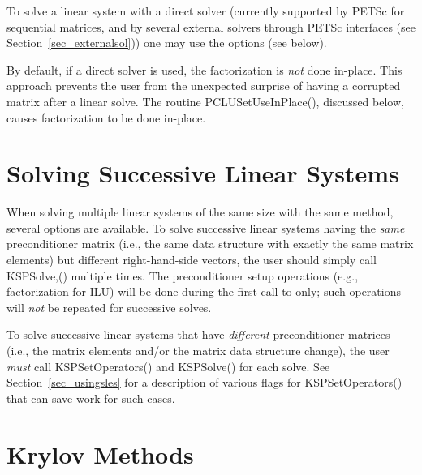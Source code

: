 To solve a linear system with a direct solver (currently supported 
by PETSc for sequential matrices, and by several external solvers through
PETSc interfaces (see Section~\ref{sec_externalsol})) one may use the options
    
(see below).

By default, if a direct solver is used, the factorization is {\em not} done 
in-place. This approach prevents the user from the unexpected surprise
of having a corrupted matrix after a linear solve. The routine 
PCLUSetUseInPlace(), discussed below, causes factorization to 
be done in-place.  

\section{Solving Successive Linear Systems}

When solving multiple linear systems of the same size with the same
method, several options are available.  To solve successive linear
systems having the {\em same} preconditioner matrix (i.e., the same
data structure with exactly the same matrix elements) but different
right-hand-side vectors, the user should simply call KSPSolve,()
multiple times.  The preconditioner setup operations (e.g.,
factorization for ILU) will be done during the first call to  only; such operations will {\em not} be repeated for
successive solves.

To solve successive linear systems that have {\em different}
preconditioner matrices (i.e., the matrix elements and/or the matrix
data structure change), the user {\em must} call 
KSPSetOperators() and KSPSolve() for each solve.  See
Section~\ref{sec_usingsles} for a description of various flags for
KSPSetOperators() that can save work for such cases.

\section{Krylov Methods}
\label{sec_ksp}

